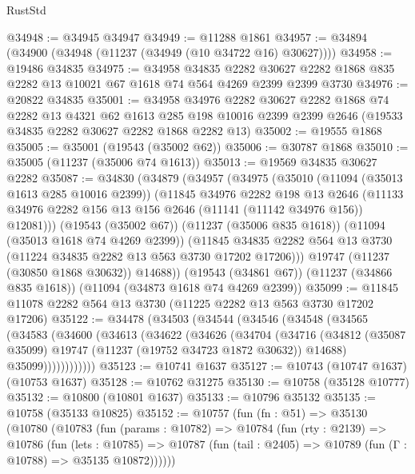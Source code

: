 \begin{lexlean}{RustStd}
\begin{coremodule}
@34948 := @34945 @34947
@34949 := @11288 @1861
@34957 := @34894 (@34900 (@34948 (@11237 (@34949 (@10 @34722 @16) @30627))))
@34958 := @19486 @34835
@34975 := @34958
    @34835
    @2282
    @30627
    @2282
    @1868
    @835
    @2282
    @13
    @10021
    @67
    @1618
    @74
    @564
    @4269
    @2399
    @2399
    @3730
@34976 := @20822 @34835
@35001 := @34958
    @34976
    @2282
    @30627
    @2282
    @1868
    @74
    @2282
    @13
    @4321
    @62
    @1613
    @285
    @198
    @10016
    @2399
    @2399
    @2646
    (@19533 @34835 @2282 @30627 @2282 @1868 @2282 @13)
@35002 := @19555 @1868
@35005 := @35001 (@19543 (@35002 @62))
@35006 := @30787 @1868
@35010 := @35005 (@11237 (@35006 @74 @1613))
@35013 := @19569 @34835 @30627 @2282
@35087 := @34830
    (@34879
      (@34957
        (@34975
          (@35010
            (@11094 (@35013 @1613 @285 @10016 @2399))
            (@11845
              @34976
              @2282
              @198
              @13
              @2646
              (@11133 @34976 @2282 @156 @13 @156 @2646 (@11141 (@11142 @34976 @156)) @12081)))
          (@19543 (@35002 @67))
          (@11237 (@35006 @835 @1618))
          (@11094 (@35013 @1618 @74 @4269 @2399))
          (@11845 @34835 @2282 @564 @13 @3730 (@11224 @34835 @2282 @13 @563 @3730 @17202 @17206)))
        @19747
        (@11237 (@30850 @1868 @30632))
        @14688))
    (@19543 (@34861 @67))
    (@11237 (@34866 @835 @1618))
    (@11094 (@34873 @1618 @74 @4269 @2399))
@35099 := @11845 @11078 @2282 @564 @13 @3730 (@11225 @2282 @13 @563 @3730 @17202 @17206)
@35122 := @34478
    (@34503
      (@34544
        (@34546
          (@34548
            (@34565
              (@34583
                (@34600
                  (@34613
                    (@34622
                      (@34626
                        (@34704
                          (@34716
                            (@34812
                              (@35087 @35099)
                              @19747
                              (@11237 (@19752 @34723 @1872 @30632))
                              @14688)
                            @35099))))))))))))
@35123 := @10741 @1637
@35127 := @10743 (@10747 @1637) (@10753 @1637)
@35128 := @10762 @31275
@35130 := @10758 (@35128 @10777)
@35132 := @10800 (@10801 @1637)
@35133 := @10796 @35132
@35135 := @10758 (@35133 @10825)
@35152 := @10757
    (fun (fn : @51) =>
    @35130
      (@10780
        (@10783
          (fun (params : @10782) =>
          @10784
            (fun (rty : @2139) =>
            @10786
              (fun (lets : @10785) =>
              @10787 (fun (tail : @2405) => @10789 (fun (Γ : @10788) => @35135 @10872))))))

\end{coremodule}
\end{lexlean}
